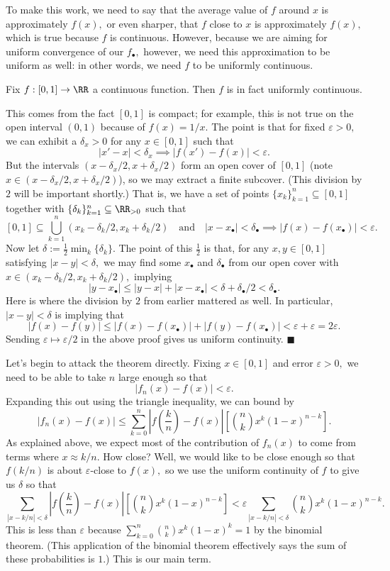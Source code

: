 To make this work, we need to say that the average value of $f$ around $x$ is approximately $f(x),$ or even sharper, that $f$ close to $x$ is approximately $f(x),$ which is true because $f$ is continuous. However, because we are aiming for uniform convergence of our $f_\bullet,$ however, we need this approximation to be uniform as well: in other words, we need $f$ to be uniformly continuous.
\begin{lemma}
    Fix $f:[0,1]\to\RR$ a continuous function. Then $f$ is in fact uniformly continuous.
\end{lemma}
This comes from the fact $[0,1]$ is compact; for example, this is not true on the open interval $(0,1)$ because of $f(x)=1/x.$ The point is that for fixed $\varepsilon>0,$ we can exhibit a $\delta_x>0$ for any $x\in[0,1]$ such that
\[|x'-x|<\delta_x\implies|f(x')-f(x)|<\varepsilon.\]
But the intervals $(x-\delta_x/2,x+\delta_x/2)$ form an open cover of $[0,1]$ (note $x\in(x-\delta_x/2,x+\delta_x/2)$), so we may extract a finite subcover. (This division by $2$ will be important shortly.) That is, we have a set of points $\{x_k\}_{k=1}^n\subseteq[0,1]$ together with $\{\delta_k\}_{k=1}^n\subseteq\RR_{>0}$ such that
\[[0,1]\subseteq\bigcup_{k=1}^n(x_k-\delta_k/2,x_k+\delta_k/2)\quad\text{and}\quad|x-x_\bullet|<\delta_\bullet\implies|f(x)-f(x_\bullet)|<\varepsilon.\]
Now let $\delta:=\frac12\min_k\{\delta_k\}.$ The point of this $\frac12$ is that, for any $x,y\in[0,1]$ satisfying $|x-y|<\delta,$ we may find some $x_\bullet$ and $\delta_\bullet$ from our open cover with $x\in(x_k-\delta_k/2,x_k+\delta_k/2),$ implying
\[|y-x_\bullet|\le|y-x|+|x-x_\bullet|<\delta+\delta_\bullet/2<\delta_\bullet.\]
Here is where the division by $2$ from earlier mattered as well. In particular, $|x-y|<\delta$ is implying that
\[|f(x)-f(y)|\le|f(x)-f(x_\bullet)|+|f(y)-f(x_\bullet)|<\varepsilon+\varepsilon=2\varepsilon.\]
Sending $\varepsilon\mapsto\varepsilon/2$ in the above proof gives us uniform continuity. $\blacksquare$

Let's begin to attack the theorem directly. Fixing $x\in[0,1]$ and error $\varepsilon>0,$ we need to be able to take $n$ large enough so that
\[|f_n(x)-f(x)|<\varepsilon.\]
Expanding this out using the triangle inequality, we can bound by
\[|f_n(x)-f(x)|\le\sum_{k=0}^n\left|f\left(\textstyle\frac kn\right)-f(x)\right|\left[\binom nkx^k(1-x)^{n-k}\right].\]
As explained above, we expect most of the contribution of $f_n(x)$ to come from terms where $x\approx k/n.$ How close? Well, we would like to be close enough so that $f(k/n)$ is about $\varepsilon$-close to $f(x),$ so we use the uniform continuity of $f$ to give us $\delta$ so that
\[\sum_{|x-k/n|<\delta}\left|f\left(\textstyle\frac kn\right)-f(x)\right|\left[\binom nkx^k(1-x)^{n-k}\right]<\varepsilon\sum_{|x-k/n|<\delta}\binom nkx^k(1-x)^{n-k}.\]
This is less than $\varepsilon$ because $\sum_{k=0}^n\binom nkx^k(1-x)^k=1$ by the binomial theorem. (This application of the binomial theorem effectively says the sum of these probabilities is $1.$) This is our main term.


